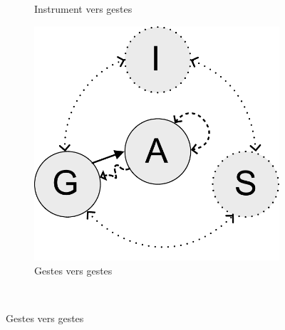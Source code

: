 \begin{figure}[!htbp]
{\begin{subfigure}[b]{.33\textwidth}
			\caption{Instrument vers gestes}
		\end{subfigure}%
		\hspace{.02\linewidth}
		\begin{subfigure}[b]{.33\textwidth}
			\centering
			\includegraphics[width=0.9\linewidth]{gfx/03_gesture/gesture-inference-c.pdf}
			\caption{Gestes vers gestes}
		\end{subfigure}%
	}\\
\end{figure}
